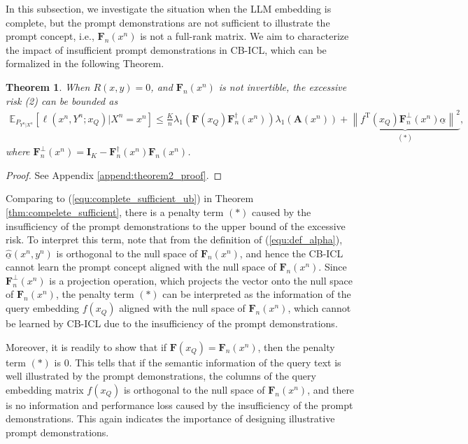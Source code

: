 \documentclass{article} %
\theoremstyle{plain} %
\newtheorem{theorem}{Theorem}[section]      %
\begin{document}
In this subsection, we investigate the situation when the LLM embedding is complete, but the prompt demonstrations are not sufficient to illustrate the prompt concept, i.e., $\mathbf{F}_n(x^n)$ is not a full-rank matrix. We aim to characterize the impact of insufficient prompt demonstrations in CB-ICL, which can be formalized in the following Theorem.

\begin{theorem}\label{thm:complete_insufficient}
When $R(x,y)=0$, and $\mathbf{F}_n(x^n)$ is not invertible, the excessive risk (2) can be bounded as
\begin{align*}
\mathbb{E}_{P_{Y^n|X^n}}\left[ 
\ell \left(x^n,Y^n;x_Q\right) | X^n = x^n\right]\leq \frac{K}{n}\lambda_1 \left(\mathbf{F}(x_Q)\mathbf{F}_n^\dagger(x^n) \right) \lambda_1(\textbf{A}(x^n)) + \underbrace{
\left\| f ^{\mathrm{T}}(x_Q)\mathbf{F}_n^\perp(x^n)\underline{\alpha}\right\|^2 
}_{(*)},
\end{align*}
where $\mathbf{F}_n^{\perp}(x^n) = \textbf{I}_K-\mathbf{F}_n^\dagger(x^n) \mathbf{F}_n(x^n)$.
\end{theorem}
\begin{proof}
    See Appendix \ref{append:theorem2_proof}.
\end{proof}
Comparing to (\ref{equ:complete_sufficient_ub}) in Theorem \ref{thm:compelete_sufficient}, there is a penalty term $(*)$ caused by the insufficiency of the prompt demonstrations to the upper bound of the excessive risk. To interpret this term, note that from the definition of (\ref{equ:def_alpha}), $\underline{\hat{\alpha}}(x^n,y^n)$ is orthogonal to the null space of $\mathbf{F}_n(x^n)$, and hence the CB-ICL cannot learn the prompt concept aligned with the null space of $\mathbf{F}_n(x^n)$. Since $\mathbf{F}_n^{\perp}(x^n)$ is a projection operation, which projects the vector onto the null space of $\mathbf{F}_n(x^n)$, the penalty term $(*)$ can be interpreted as the information of the query embedding $f (x_Q)$ aligned with the null space of $\mathbf{F}_n(x^n)$, which cannot be learned by CB-ICL due to the insufficiency of the prompt demonstrations.

Moreover, it is readily to show that if $\mathbf{F}(x_Q) = \mathbf{F}_n(x^n)$, then the penalty term $(*)$ is 0. This tells that if the semantic information of the query text is well illustrated by the prompt demonstrations, the columns of the query embedding matrix $f (x_Q)$ is orthogonal to the null space of $\mathbf{F}_n(x^n)$, and there is no information and performance loss caused by the insufficiency of the prompt demonstrations. This again indicates the importance of designing illustrative prompt demonstrations.
\end{document}
